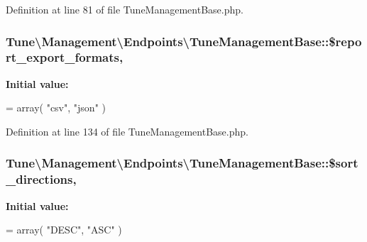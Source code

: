 Definition at line 81 of file Tune\-Management\-Base.\-php.

\hypertarget{classTune_1_1Management_1_1Endpoints_1_1TuneManagementBase_a99cfa7a88f10ac6ca74eccd832cf2dba}{
\subsubsection[{\$report\-\_\-export\-\_\-formats}]{\setlength{\rightskip}{0pt plus 5cm}Tune\textbackslash{}\-Management\textbackslash{}\-Endpoints\textbackslash{}\-Tune\-Management\-Base\-::\$report\-\_\-export\-\_\-formats\hspace{0.3cm}{\ttfamily [static]}, {\ttfamily [protected]}}}\label{classTune_1_1Management_1_1Endpoints_1_1TuneManagementBase_a99cfa7a88f10ac6ca74eccd832cf2dba}
{\bfseries Initial value\-:}
\begin{DoxyCode}
= array(
            \textcolor{stringliteral}{"csv"},
            \textcolor{stringliteral}{"json"}
        )
\end{DoxyCode}


Definition at line 134 of file Tune\-Management\-Base.\-php.

\hypertarget{classTune_1_1Management_1_1Endpoints_1_1TuneManagementBase_acff11dacff948faf210f3539c33ebd01}{
\subsubsection[{\$sort\-\_\-directions}]{\setlength{\rightskip}{0pt plus 5cm}Tune\textbackslash{}\-Management\textbackslash{}\-Endpoints\textbackslash{}\-Tune\-Management\-Base\-::\$sort\-\_\-directions\hspace{0.3cm}{\ttfamily [static]}, {\ttfamily [protected]}}}\label{classTune_1_1Management_1_1Endpoints_1_1TuneManagementBase_acff11dacff948faf210f3539c33ebd01}
{\bfseries Initial value\-:}
\begin{DoxyCode}
= array(
            \textcolor{stringliteral}{"DESC"},
            \textcolor{stringliteral}{"ASC"}
        )
\end{DoxyCode}


